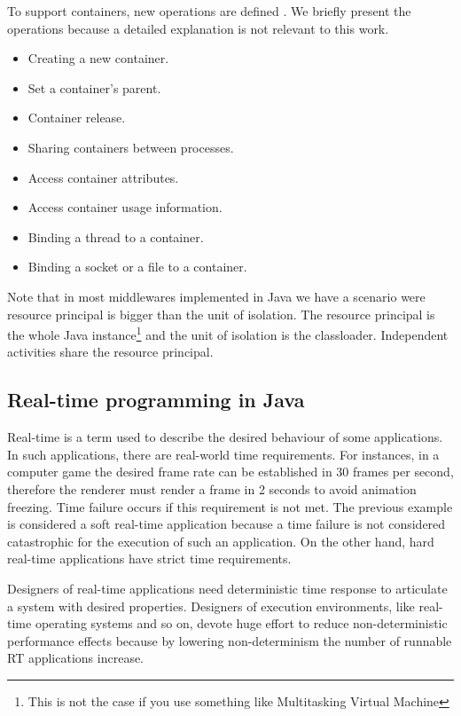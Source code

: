 To support containers, new operations are defined \cite{Banga:1999:RCN:296806.296810}. We briefly present the operations because a detailed explanation is not relevant to this work.
\begin{itemize}
\item Creating a new container.
\item Set a container's parent.
\item Container release.
\item Sharing containers between processes.
\item Access container attributes.
\item Access container usage information.
\item Binding a thread to a container.
\item Binding a socket or a file to a container.
\end{itemize}

Note that in most middlewares implemented in Java we have a scenario were resource principal is bigger than the unit of isolation.
The resource principal is the whole Java instance\footnote{This is not the case if you use something like Multitasking Virtual Machine} and the unit of isolation is the classloader. Independent activities share the resource principal.

\subsection{Real-time programming in Java}
Real-time is a term used to describe the desired behaviour of some applications.
In such applications, there are real-world time requirements.
For instances, in a computer game the desired frame rate can be established in 30 frames per second, therefore the renderer must render a frame in 2 seconds to avoid animation freezing.
Time failure occurs if this requirement is not met.
The previous example is considered a soft real-time application because a time failure is not considered catastrophic for the execution of such an application.
On the other hand, hard real-time applications have strict time requirements.

Designers of real-time applications need deterministic time response to articulate a system with desired properties.
Designers of execution environments, like real-time operating systems and so on, devote huge effort to reduce non-deterministic performance effects because by lowering non-determinism the number of runnable RT applications increase.


